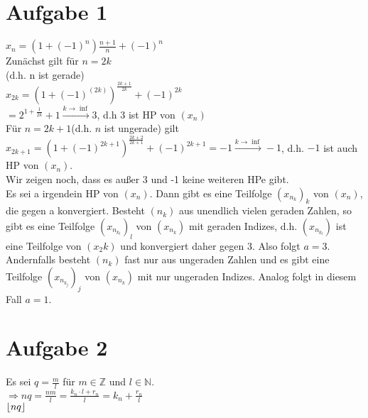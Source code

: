 \documentclass{article}
\DeclarePairedDelimiter\floor{\lfloor}{\rfloor}
\begin{document}
	\section{Aufgabe 1}
		$x_n=(1+(-1)^n)\frac{n+1}{n}+(-1)^n$\\
		Zunächst gilt für $n=2k$\\
		(d.h. n ist gerade)\\
		$x_{2k}=(1+(-1)^(2k))^{\frac{2k+1}{2k}}+(-1)^{2k}$\\
		$=2^{1+\frac{1}{2k}}+1\stackrel{k\to\inf}{\rightarrow}3$, d.h 3 ist HP von $(x_n)$\\
		Für $n=2k+1$(d.h. $n$ ist ungerade) gilt\\
		$x_{2k+1}=(1+(-1)^{2k+1})^{\frac{2k+2}{2k+1}}+(-1)^{2k+1}=-1\stackrel{k\to\inf}{\rightarrow}-1$, d.h. $-1$ ist auch HP von $(x_n)$.\\
		Wir zeigen noch, dass es außer 3 und -1 keine weiteren HPe gibt.\\
		Es sei a irgendein HP von $(x_n)$. Dann gibt es eine Teilfolge $(x_{n_k})_k$ von $(x_n)$, die gegen a konvergiert. Besteht $(n_k)$ aus unendlich vielen geraden Zahlen, so gibt es eine Teilfolge $(x_{n_{k_l}})_l$ von $(x_{n_k})$ mit geraden Indizes, d.h. $(x_{n_{k_l}})$ ist eine Teilfolge von $(x_2k)$ und konvergiert daher gegen 3. Also folgt $a=3$. Andernfalls besteht $(n_k)$ fast nur aus ungeraden Zahlen und es gibt eine Teilfolge $(x_{n_{k_j}})_j$ von $(x_{n_k})$ mit nur ungeraden Indizes. Analog folgt in diesem Fall $a=1$.
	\section{Aufgabe 2}  
		Es sei $q=\frac{m}{l}$ für $m\in\mathbb{Z}$ und $l \in \mathbb{N}$.\\
		$\Rightarrow nq=\frac{nm}{l}=\frac{k_n\cdot l+r_n}{l}=k_n+\frac{r_n}{l}$\\
		$\floor{nq}$
\end{document}
